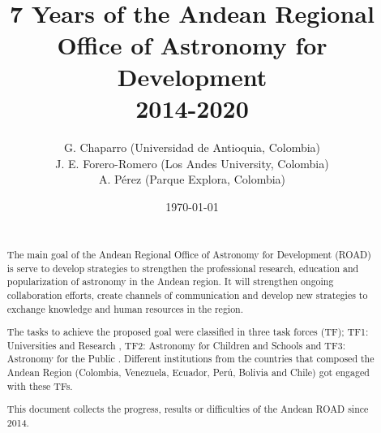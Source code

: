 \documentclass[paper=a4, fontsize=11pt]{scrartcl} %
\title{	
\normalfont \normalsize 
\textsc{} \\ [25pt] %
\horrule{0.5pt} \\[0.4cm] %
\huge  7 Years of the Andean Regional Office of Astronomy for Development\\ 2014-2020 %
\horrule{2pt} \\[0.5cm] %
}
\author{G. Chaparro (Universidad de Antioquia, Colombia)\\
J. E. Forero-Romero (Los Andes University, Colombia)\\
A. P\'erez (Parque Explora, Colombia)} %
\date{\normalsize\today} %
\numberwithin{equation}{section} %
\numberwithin{figure}{section} %
\numberwithin{table}{section} %
\begin{document}
\maketitle %

\newpage
\begin{abstract}

{ }\\

The main goal of the Andean Regional Office of Astronomy for
Development (ROAD) is serve to develop strategies to strengthen the
professional research, education and popularization of astronomy in
the Andean region. It will strengthen ongoing collaboration efforts,
create channels of communication and develop new strategies to
exchange knowledge and human resources in the region. 


The tasks to achieve the proposed goal were classified in three task
forces (TF); TF1: Universities and Research , TF2: Astronomy for Children
and Schools and TF3: Astronomy for the Public . Different institutions
from the countries that composed the Andean Region (Colombia,
Venezuela, Ecuador, Perú, Bolivia and Chile) got engaged with these
TFs. 


This document collects the progress, results or difficulties of the
Andean ROAD since 2014.  

\end{abstract}

\newpage
\tableofcontents









%
%


%
%
\end{document}
